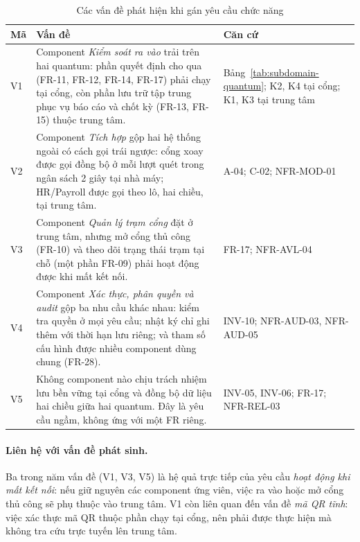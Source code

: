 \begin{table}[H]
\centering
\caption{Các vấn đề phát hiện khi gán yêu cầu chức năng}\label{tab:logical-issues}
\small
\renewcommand{\arraystretch}{1.3}
\begin{tabularx}{\textwidth}{|>{\centering\arraybackslash}p{0.8cm}|>{\raggedright\arraybackslash}X|>{\raggedright\arraybackslash}p{4.6cm}|}
\hline
\textbf{Mã} & \textbf{Vấn đề} & \textbf{Căn cứ} \\
\hline
V1 & Component \textit{Kiểm soát ra vào} trải trên hai quantum: phần quyết định cho qua (FR-11, FR-12, FR-14, FR-17) phải chạy tại cổng, còn phần lưu trữ tập trung phục vụ báo cáo và chốt kỳ (FR-13, FR-15) thuộc trung tâm. & Bảng~\ref{tab:subdomain-quantum}; K2, K4 tại cổng; K1, K3 tại trung tâm \\
\hline
V2 & Component \textit{Tích hợp} gộp hai hệ thống ngoài có cách gọi trái ngược: cổng xoay được gọi đồng bộ ở mỗi lượt quét trong ngân sách 2 giây tại nhà máy; HR/Payroll được gọi theo lô, hai chiều, tại trung tâm. & A-04; C-02; NFR-MOD-01 \\
\hline
V3 & Component \textit{Quản lý trạm cổng} đặt ở trung tâm, nhưng mở cổng thủ công (FR-10) và theo dõi trạng thái trạm tại chỗ (một phần FR-09) phải hoạt động được khi mất kết nối. & FR-17; NFR-AVL-04 \\
\hline
V4 & Component \textit{Xác thực, phân quyền và audit} gộp ba nhu cầu khác nhau: kiểm tra quyền ở mọi yêu cầu; nhật ký chỉ ghi thêm với thời hạn lưu riêng; và tham số cấu hình được nhiều component dùng chung (FR-28). & INV-10; NFR-AUD-03, NFR-AUD-05 \\
\hline
V5 & Không component nào chịu trách nhiệm lưu bền vững tại cổng và đồng bộ dữ liệu hai chiều giữa hai quantum. Đây là yêu cầu ngầm, không ứng với một FR riêng. & INV-05, INV-06; FR-17; NFR-REL-03 \\
\hline
\end{tabularx}
\end{table}

\paragraph{Liên hệ với vấn đề phát sinh.} Ba trong năm vấn đề (V1, V3, V5) là hệ quả trực tiếp của yêu cầu \textit{hoạt động khi mất kết nối}: nếu giữ nguyên các component ứng viên, việc ra vào hoặc mở cổng thủ công sẽ phụ thuộc vào trung tâm. V1 còn liên quan đến vấn đề \textit{mã QR tĩnh}: việc xác thực mã QR thuộc phần chạy tại cổng, nên phải được thực hiện mà không tra cứu trực tuyến lên trung tâm.

